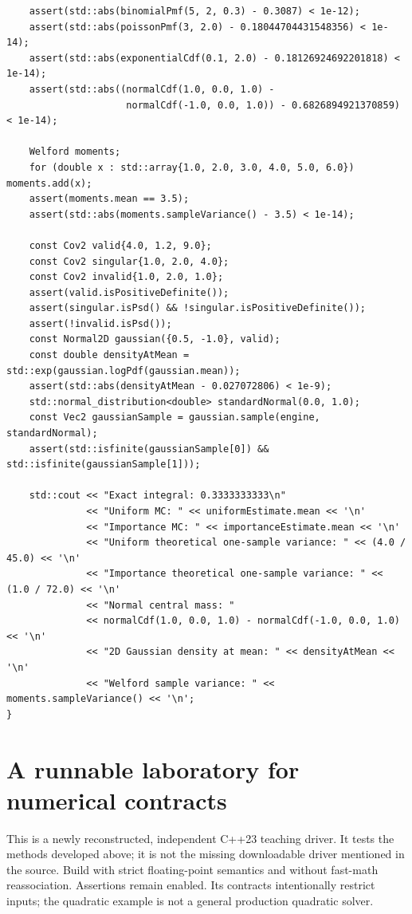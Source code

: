 \begin{verbatim}
    assert(std::abs(binomialPmf(5, 2, 0.3) - 0.3087) < 1e-12);
    assert(std::abs(poissonPmf(3, 2.0) - 0.18044704431548356) < 1e-14);
    assert(std::abs(exponentialCdf(0.1, 2.0) - 0.18126924692201818) < 1e-14);
    assert(std::abs((normalCdf(1.0, 0.0, 1.0) -
                     normalCdf(-1.0, 0.0, 1.0)) - 0.6826894921370859) < 1e-14);

    Welford moments;
    for (double x : std::array{1.0, 2.0, 3.0, 4.0, 5.0, 6.0}) moments.add(x);
    assert(moments.mean == 3.5);
    assert(std::abs(moments.sampleVariance() - 3.5) < 1e-14);

    const Cov2 valid{4.0, 1.2, 9.0};
    const Cov2 singular{1.0, 2.0, 4.0};
    const Cov2 invalid{1.0, 2.0, 1.0};
    assert(valid.isPositiveDefinite());
    assert(singular.isPsd() && !singular.isPositiveDefinite());
    assert(!invalid.isPsd());
    const Normal2D gaussian({0.5, -1.0}, valid);
    const double densityAtMean = std::exp(gaussian.logPdf(gaussian.mean));
    assert(std::abs(densityAtMean - 0.027072806) < 1e-9);
    std::normal_distribution<double> standardNormal(0.0, 1.0);
    const Vec2 gaussianSample = gaussian.sample(engine, standardNormal);
    assert(std::isfinite(gaussianSample[0]) && std::isfinite(gaussianSample[1]));

    std::cout << "Exact integral: 0.3333333333\n"
              << "Uniform MC: " << uniformEstimate.mean << '\n'
              << "Importance MC: " << importanceEstimate.mean << '\n'
              << "Uniform theoretical one-sample variance: " << (4.0 / 45.0) << '\n'
              << "Importance theoretical one-sample variance: " << (1.0 / 72.0) << '\n'
              << "Normal central mass: "
              << normalCdf(1.0, 0.0, 1.0) - normalCdf(-1.0, 0.0, 1.0) << '\n'
              << "2D Gaussian density at mean: " << densityAtMean << '\n'
              << "Welford sample variance: " << moments.sampleVariance() << '\n';
}
\end{verbatim}

\section{A runnable laboratory for numerical contracts}\label{02-foundations-ii-ch038-a-runnable-laboratory-for-numerical-contracts}

\hypertarget{02-foundations-ii-ch038-a-runnable-laboratory-for-numerical-contracts}{}

This is a newly reconstructed, independent C++23 teaching driver. It tests the methods developed above; it is not the missing downloadable driver mentioned in the source. Build with strict floating-point semantics and without fast-math reassociation. Assertions remain enabled. Its contracts intentionally restrict inputs; the quadratic example is not a general production quadratic solver.

